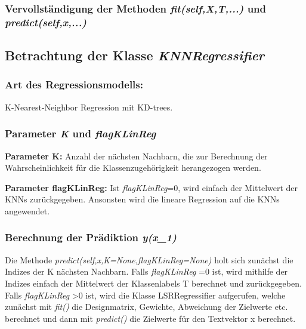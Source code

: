 \subsubsection{ Vervollständigung der Methoden \textit{fit(self,X,T,...)} und \textit{predict(self,x,...)} }

\subsection{
    Betrachtung der Klasse \textit{KNNRegressifier}
}

\subsubsection{ Art des Regressionsmodells: }

\noindent
\vspace{5px}
K-Nearest-Neighbor Regression mit KD-trees. 

\subsubsection{ Parameter \textit{K} und \textit{flagKLinReg} }

\noindent
\vspace{5px}
\textbf{Parameter K:} Anzahl der nächsten Nachbarn, die zur Berechnung der Wahrscheinlichkeit für die Klassenzugehörigkeit herangezogen werden.  

\noindent
\vspace{5px}
\textbf{Parameter flagKLinReg:} Ist \textit{flagKLinReg}=0, wird einfach der Mittelwert der KNNs zurückgegeben.
Ansonsten wird die lineare Regression auf die KNNs angewendet. 

\subsubsection{ Berechnung der Prädiktion \textit{y(x_1)} }

\noindent
\vspace{5px}
Die Methode \textit{predict(self,x,K=None,flagKLinReg=None)} holt sich zunächst die Indizes der K nächsten Nachbarn. 
Falls \textit{ flagKLinReg }=0 ist, wird mithilfe der Indizes einfach der Mittelwert der Klassenlabels T berechnet und zurückgegeben. 
Falls \textit{ flagKLinReg }>0 ist, wird die Klasse LSRRegressifier aufgerufen, welche zunächst mit \textit{ fit() } die Designmatrix, Gewichte, Abweichung der Zielwerte etc. berechnet und dann mit \textit{ predict() } die Zielwerte für den Textvektor x berechnet. 

